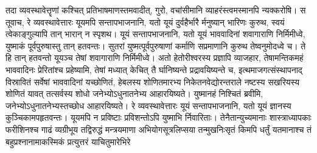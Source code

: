 \vakya तदा व्यवस्थावेत्तॄणां कश्चित् प्रतिभाषमाणस्तमवादीत्, गुरो, वचांसीमानि व्याहरंस्त्वमस्मानपि न्यक्करोषि।
\vakya स तूवाच, रे व्यवस्थावेत्तारः यूयमपि सन्तापभाजनानि, यतो यूयं दुर्वहैर्भारै र्मनुष्यान् भारिणः कुरुथ, स्वयं त्वेकाङ्गुल्यापि तान् भारान् न स्पृशथ।
\vakya यूयं सन्तापभाजनानि, यतो यूयं भाववादिनां शवागाराणि निर्मिमीध्वे, युष्माकं पूर्वपुरुषास्तु तान् हतवन्तः।
\vakya सुतरां युष्मत्पूर्वपुरुषाणां कर्माणि सप्रमाणानि कुरुथ तेष्वनुमोदध्वे च। ते हि तान् हतवन्तो यूयञ्च तेषां शवागाराणि निर्मिमीध्वे।
\vakya अतो हेतोरीश्वरस्य प्रज्ञापि व्याजहार, तेषामन्तिकमहं भाववादिनः प्रेरितांश्च प्रहेष्यामि, तेषां मध्यात् केचित् तै र्घानिष्यन्ते प्रद्रावयिष्यन्ते च,
\vakya इत्थमाजगत्संस्थापनाद् विस्रावितं सर्वेषां भाववादिनां यच्छोणितं,
\vakya हेबलस्य शोणितमारभ्य निकेतनवेद्योरन्तराले नष्टस्य सखरियस्य शोणितं यावत् तत्सर्वस्य शोधो जनेभ्योऽधुनातनेभ्य आहारयिष्यते। युष्मानहं निश्चितं ब्रवीमि, जनेभ्योऽधुनातनेभ्यस्तच्छोध आहारयिष्यते।
\vakya रे व्यवस्थावेत्तारः यूयं सन्तापभाजनानि, यतो यूयं ज्ञानस्य कुञ्चिकामपहृतवन्तः। यूयमपि न प्रविष्टाः प्रविशन्तोऽपि युष्माभि र्निवारिताः।
\vakya तेनैतान्युच्यमानाः शास्त्राध्यापकाः फरीशिनश्च गाढं व्यग्रीभूय तद्विरुद्धं मन्त्रयमाणा अभियोगसूत्रलिप्सया तन्मुखनिःसृतं किमपि धर्तुं यतमानाश्च तं बहुप्रश्नानामाकस्मिकं प्रत्युत्तरं याचितुमारेभिरे\eoc